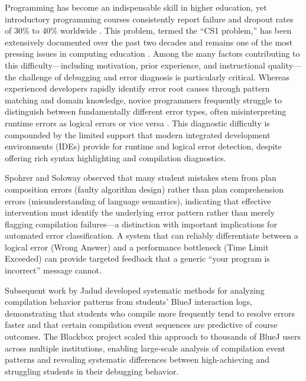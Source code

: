 \documentclass[10pt,a4paper]{article}
\begin{document}
Programming has become an indispensable skill in higher education, yet
introductory programming courses consistently report failure and dropout rates
of 30\% to 40\% worldwide \cite{bennedsen2007failure}\cite{watson2018failure}. This
problem, termed the ``CS1 problem,'' has been extensively
documented over the past two decades and remains one of the most pressing
issues in computing education \cite{pears2007survey}. Among the many factors
contributing to this difficulty---including motivation, prior experience,
and instructional quality---the challenge of debugging and error diagnosis is
particularly critical. Whereas experienced developers rapidly identify
error root causes through pattern matching and domain knowledge, novice
programmers frequently struggle to distinguish between fundamentally different
error types, often misinterpreting runtime errors as logical errors or vice
versa \cite{mccauley2008evidence}. This diagnostic difficulty is compounded by
the limited support that modern integrated development environments (IDEs)
provide for runtime and logical error detection, despite offering rich
syntax highlighting and compilation diagnostics.

Spohrer and Soloway \cite{spohrer1986novice} observed that many student
mistakes stem from plan composition errors (faulty algorithm design) rather
than plan comprehension errors (misunderstanding of language semantics),
indicating that effective intervention must identify the underlying
error pattern rather than merely flagging compilation failures---a distinction
with important implications for automated error classification.
A system that can reliably differentiate between a logical error (Wrong
Answer) and a performance bottleneck (Time Limit Exceeded) can provide
targeted feedback that a generic ``your program is incorrect'' message cannot.

Subsequent work by Jadud \cite{jadud2006methods} developed systematic methods
for analyzing compilation behavior patterns from students' BlueJ interaction
logs, demonstrating that students who compile more frequently tend to resolve
errors faster and that certain compilation event sequences are predictive of
course outcomes. The Blackbox project \cite{bey2022analyzing} scaled this
approach to thousands of BlueJ users across multiple institutions, enabling
large-scale analysis of compilation event patterns and revealing systematic
differences between high-achieving and struggling students in their debugging
behavior.
\end{document}
